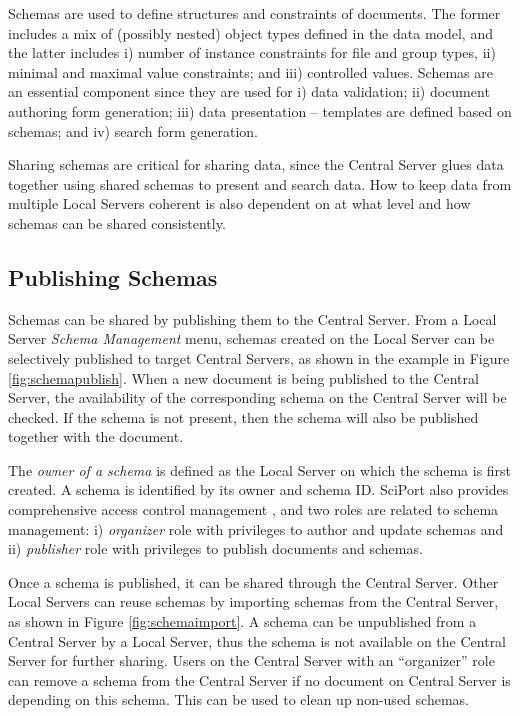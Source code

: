 \documentclass{singlecol-new}
\theoremstyle{TH}{
\newtheorem{lemma}{Lemma}
\newtheorem{theorem}[lemma]{Theorem}
\newtheorem{corrolary}[lemma]{Corrolary}
\newtheorem{conjecture}[lemma]{Conjecture}
\newtheorem{proposition}[lemma]{Proposition}
\newtheorem{claim}[lemma]{Claim}
\newtheorem{stheorem}[lemma]{Wrong Theorem}
\newtheorem{algorithm}{Algorithm}
}
\theoremstyle{THrm}{
\newtheorem{definition}{Definition}[section]
\newtheorem{question}{Question}[section]
\newtheorem{remark}{Remark}
\newtheorem{scheme}{Scheme}
}
\theoremstyle{THhit}{
\newtheorem{case}{Case}[section]
}
\begin{document}
Schemas are used to define structures and constraints of documents.
The former includes a mix of (possibly nested) object types defined
in the data model, and the latter includes i) number of instance
constraints for file and group types, ii) minimal and maximal value
constraints; and iii) controlled values.  Schemas are an essential
component  since they are used for i) data validation; ii) document
authoring form generation; iii) data presentation -- templates are
defined based on schemas; and iv) search form generation.


Sharing schemas are critical for sharing data, since the Central
Server glues data together using shared schemas to present and
search data. How to keep data from multiple Local Servers coherent
is also dependent on at what level and how schemas can be shared
consistently.


\subsection{Publishing Schemas}

Schemas can be shared by publishing them to the Central Server. From
a  Local Server {\em Schema Management} menu, schemas created on the
Local Server can be selectively published to target Central Servers,
as shown in the example in Figure \ref{fig:schemapublish}. When a
new document is being published to the Central Server, the
availability of the corresponding schema on the Central Server will
be checked. If the schema is not present, then the schema will also
be published together with the document.


The {\em owner of a schema} is defined as the Local Server on which
the schema is first created.  A schema is identified by its owner
and schema ID.  SciPort also provides comprehensive access control
management \cite{wang09security}, and two roles are related to
schema management: i) {\em organizer} role with privileges to author
and update schemas and ii) {\em publisher} role with  privileges to
publish documents and schemas.


Once a schema is published, it can be shared through the Central
Server. Other Local Servers can reuse schemas by importing schemas
from the Central Server, as shown in Figure \ref{fig:schemaimport}.
A schema can be unpublished from a Central Server by a Local Server,
thus the schema is not available on the Central Server for further
sharing.  Users on the Central Server with an ``organizer'' role can
remove a schema from the Central Server if no document on Central
Server is depending on this schema. This can be used to clean up
non-used schemas.
\end{document}
